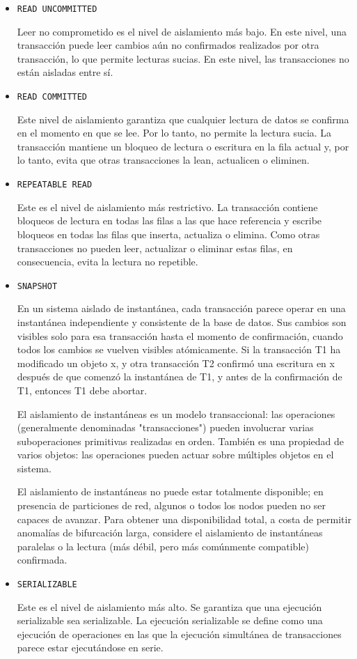 \begin{itemize}
\item \texttt{READ UNCOMMITTED}

Leer no comprometido es el nivel de aislamiento más bajo. En este nivel, una transacción puede leer cambios aún no confirmados realizados por otra transacción, lo que permite lecturas sucias. En este nivel, las transacciones no están aisladas entre sí.

\item \texttt{READ COMMITTED  }

Este nivel de aislamiento garantiza que cualquier lectura de datos se confirma en el momento en que se lee. Por lo tanto, no permite la lectura sucia. La transacción mantiene un bloqueo de lectura o escritura en la fila actual y, por lo tanto, evita que otras transacciones la lean, actualicen o eliminen.

\item \texttt{REPEATABLE READ  }

Este es el nivel de aislamiento más restrictivo. La transacción contiene bloqueos de lectura en todas las filas a las que hace referencia y escribe bloqueos en todas las filas que inserta, actualiza o elimina. Como otras transacciones no pueden leer, actualizar o eliminar estas filas, en consecuencia, evita la lectura no repetible.

\item \texttt{SNAPSHOT  }

En un sistema aislado de instantánea, cada transacción parece operar en una instantánea independiente y consistente de la base de datos. Sus cambios son visibles solo para esa transacción hasta el momento de confirmación, cuando todos los cambios se vuelven visibles atómicamente. Si la transacción T1 ha modificado un objeto x, y otra transacción T2 confirmó una escritura en x después de que comenzó la instantánea de T1, y antes de la confirmación de T1, entonces T1 debe abortar.

El aislamiento de instantáneas es un modelo transaccional: las operaciones (generalmente denominadas "transacciones") pueden involucrar varias suboperaciones primitivas realizadas en orden. También es una propiedad de varios objetos: las operaciones pueden actuar sobre múltiples objetos en el sistema.

El aislamiento de instantáneas no puede estar totalmente disponible; en presencia de particiones de red, algunos o todos los nodos pueden no ser capaces de avanzar. Para obtener una disponibilidad total, a costa de permitir anomalías de bifurcación larga, considere el aislamiento de instantáneas paralelas o la lectura (más débil, pero más comúnmente compatible) confirmada.

\item \texttt{SERIALIZABLE  }

Este es el nivel de aislamiento más alto. Se garantiza que una ejecución serializable sea serializable. La ejecución serializable se define como una ejecución de operaciones en las que la ejecución simultánea de transacciones parece estar ejecutándose en serie.

\end{itemize}